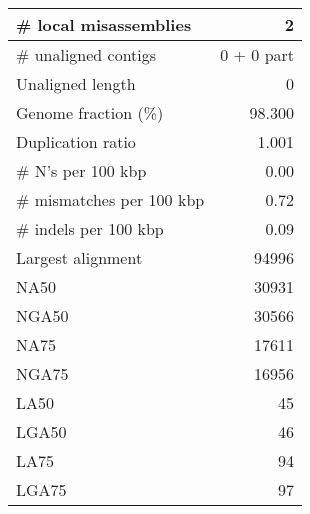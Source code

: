 \documentclass[12pt,a4paper]{article}
\begin{document}
\begin{table}[ht]
\begin{center}
\begin{tabular}{|l*{1}{|r}|}
\# local misassemblies & 2 \\ \hline
\# unaligned contigs & 0 + 0 part \\ \hline
Unaligned length & 0 \\ \hline
Genome fraction (\%) & 98.300 \\ \hline
Duplication ratio & 1.001 \\ \hline
\# N's per 100 kbp & 0.00 \\ \hline
\# mismatches per 100 kbp & 0.72 \\ \hline
\# indels per 100 kbp & 0.09 \\ \hline
Largest alignment & 94996 \\ \hline
NA50 & 30931 \\ \hline
NGA50 & 30566 \\ \hline
NA75 & 17611 \\ \hline
NGA75 & 16956 \\ \hline
LA50 & 45 \\ \hline
LGA50 & 46 \\ \hline
LA75 & 94 \\ \hline
LGA75 & 97 \\ \hline
\end{tabular}
\end{center}
\end{table}
\end{document}
